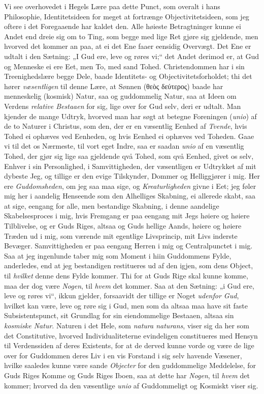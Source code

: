 \documentclass[12pt,a4paper]{book}
\newcommand{\apage}[1]{\marginnote{\footnotesize\textit{[#1]}}}
\begin{document}
Vi see overhovedet i Hegels Lære paa dette Punct, som overalt i hans Philosophie,
Identitetsideen for meget at fortrænge Objectivitetsideen, som jeg oftere i det
Foregaaende har kaldet den. Alle høieste Betragtninger kunne ei Andet end dreie
sig om to Ting, som begge med lige Ret gjøre sig gjeldende, men hvorved det kommer
an paa, at ei det Ene faaer eensidig Overvægt. Det Ene er udtalt i den Sætning:
„I Gud ere, leve og røres vi;“ det Andet derimod er, at Gud og Menneske ei ere
Eet, men To, med sand Tohed. Christendommen har i sin Treenighedslære begge Dele,
baade Identitets- og Objectivitetsforholdet; thi det hører \emph{væsentligen} til denne
Lære, at Sønnen (θεὸς δεύτερος) baade har menneskelig (kosmisk) Natur, saa og
guddommelig Natur, saa at Ideen om Verdens \emph{relative Bestaaen} for sig, lige over
for Gud selv, deri er udtalt. Man kjender de mange Udtryk, hvorved man har søgt at
betegne Foreningen (\textit{unio}) af de to Naturer i Christus, som den, der er en
væsentlig Eenhed af \emph{Tvende}, hvis Tohed ei ophæves ved Eenheden, og hvis Eenhed ei
ophæves ved Toheden. Gaae vi til det os Nærmeste, til vort eget Indre, saa er
saadan \textit{unio} af en \apage{145} væsentlig Tohed, der gjør sig lige saa gjeldende qvå
Tohed, som qvå Eenhed, givet os selv, Enhver i sin Personlighed, i Samvittigheden,
der væsentligen er Udtrykket af mit dybeste Jeg, og tillige er den evige
Tilskynder, Dommer og Helliggjører i mig. Her ere \emph{Guddomsheden}, om jeg saa maa
sige, og \emph{Kreaturligheden} givne i Eet; jeg føler mig her i aandelig Henseende som
den Alhelliges Skabning, ei allerede skabt, saa at sige, eengang for alle, men
bestandige Skabning, i denne aandelige Skabelsesproces i mig, hvis Fremgang er paa
eengang mit Jegs høiere og høiere Tilblivelse, og er Guds Riges, altsaa og Guds
hellige Aands, høiere og høiere Træden ud i mig, som værende mit egentlige
Livsprincip, mit Livs inderste Bevæger. Samvittigheden er paa eengang Herren i mig
og Centralpunctet i mig. Saa at jeg ingenlunde taber mig som Moment i hiin
Guddommens Fylde, anderledes, end at jeg bestandigen restitueres ud af den igjen,
som dens Object, til \emph{hvilket} denne dens Fylde kommer. Thi for at Guds Rige skal
kunne komme, maa der dog være \emph{Nogen}, til \emph{hvem} det kommer. Saa at den Sætning: „i
Gud ere, leve og røres vi“, ikkun gjelder, forsaavidt der tillige er Noget \emph{udenfor
Gud}, hvilket kan være, leve og røre sig i Gud, men som da altsaa maa have sit
faste Subsistentspunct, sit Grundlag for sin eiendommelige Bestaaen, altsaa sin
\emph{kosmiske Natur}. Naturen i det Hele, som \textit{natura naturans}, viser sig da her
som det Constitutive, hvorved Individualiteterne evindeligen constitueres med
Hensyn til Verdenssiden af deres Existents, for at de derved kunne vorde og være
de lige over for Guddommen deres Liv i en vis Forstand i sig selv havende Væsener,
hvilke saaledes kunne være sande \emph{Objecter} for den guddommelige Meddelelse, for
Guds Riges Komme og Guds Riges Iboen, saa at dette har \emph{Nogen}, til \emph{hvem} det kommer;
hvorved da den væsentlige \emph{\textit{unio}} af Guddommeligt og Kosmiskt viser sig.
\end{document}
